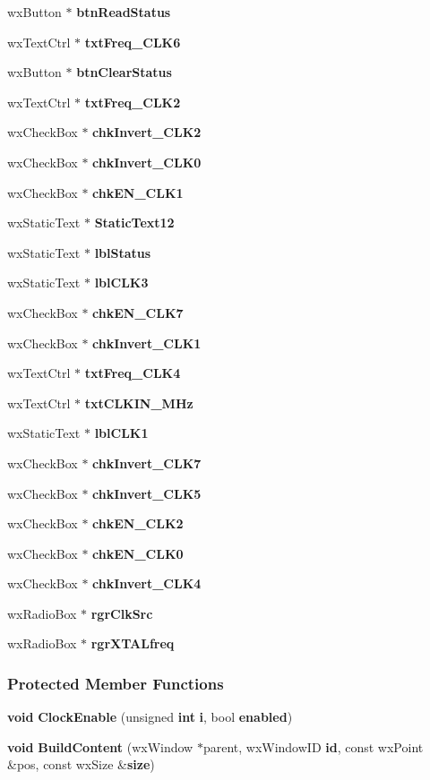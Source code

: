 \begin{DoxyCompactItemize}
wx\+Button $\ast$ {\bf btn\+Read\+Status}
\item 
wx\+Text\+Ctrl $\ast$ {\bf txt\+Freq\+\_\+\+C\+L\+K6}
\item 
wx\+Button $\ast$ {\bf btn\+Clear\+Status}
\item 
wx\+Text\+Ctrl $\ast$ {\bf txt\+Freq\+\_\+\+C\+L\+K2}
\item 
wx\+Check\+Box $\ast$ {\bf chk\+Invert\+\_\+\+C\+L\+K2}
\item 
wx\+Check\+Box $\ast$ {\bf chk\+Invert\+\_\+\+C\+L\+K0}
\item 
wx\+Check\+Box $\ast$ {\bf chk\+E\+N\+\_\+\+C\+L\+K1}
\item 
wx\+Static\+Text $\ast$ {\bf Static\+Text12}
\item 
wx\+Static\+Text $\ast$ {\bf lbl\+Status}
\item 
wx\+Static\+Text $\ast$ {\bf lbl\+C\+L\+K3}
\item 
wx\+Check\+Box $\ast$ {\bf chk\+E\+N\+\_\+\+C\+L\+K7}
\item 
wx\+Check\+Box $\ast$ {\bf chk\+Invert\+\_\+\+C\+L\+K1}
\item 
wx\+Text\+Ctrl $\ast$ {\bf txt\+Freq\+\_\+\+C\+L\+K4}
\item 
wx\+Text\+Ctrl $\ast$ {\bf txt\+C\+L\+K\+I\+N\+\_\+\+M\+Hz}
\item 
wx\+Static\+Text $\ast$ {\bf lbl\+C\+L\+K1}
\item 
wx\+Check\+Box $\ast$ {\bf chk\+Invert\+\_\+\+C\+L\+K7}
\item 
wx\+Check\+Box $\ast$ {\bf chk\+Invert\+\_\+\+C\+L\+K5}
\item 
wx\+Check\+Box $\ast$ {\bf chk\+E\+N\+\_\+\+C\+L\+K2}
\item 
wx\+Check\+Box $\ast$ {\bf chk\+E\+N\+\_\+\+C\+L\+K0}
\item 
wx\+Check\+Box $\ast$ {\bf chk\+Invert\+\_\+\+C\+L\+K4}
\item 
wx\+Radio\+Box $\ast$ {\bf rgr\+Clk\+Src}
\item 
wx\+Radio\+Box $\ast$ {\bf rgr\+X\+T\+A\+Lfreq}
\end{DoxyCompactItemize}
\subsubsection*{Protected Member Functions}
\begin{DoxyCompactItemize}
\item 
{\bf void} {\bf Clock\+Enable} (unsigned {\bf int} {\bf i}, bool {\bf enabled})
\item 
{\bf void} {\bf Build\+Content} (wx\+Window $\ast$parent, wx\+Window\+ID {\bf id}, const wx\+Point \&pos, const wx\+Size \&{\bf size})
\end{DoxyCompactItemize}
